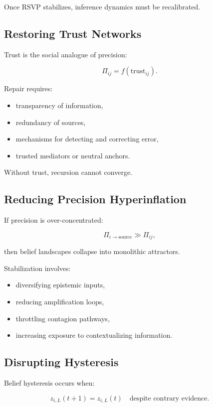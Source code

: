 \documentclass[12pt,oneside]{book}
\theoremstyle{plain}
\theoremstyle{definition}
\begin{document}
Once RSVP stabilizes, inference dynamics must be recalibrated.

\subsection{Restoring Trust Networks}

Trust is the social analogue of precision:

\[
\Pi_{ij} = f(\text{trust}_{ij}).
\]

Repair requires:

\begin{itemize}
    \item transparency of information,
    \item redundancy of sources,
    \item mechanisms for detecting and correcting error,
    \item trusted mediators or neutral anchors.
\end{itemize}

Without trust, recursion cannot converge.

\subsection{Reducing Precision Hyperinflation}

If precision is over-concentrated:

\[
\Pi_{i\rightarrow \text{source}} \gg \Pi_{ij},
\]

then belief landscapes collapse into monolithic attractors.

Stabilization involves:

\begin{itemize}
    \item diversifying epistemic inputs,
    \item reducing amplification loops,
    \item throttling contagion pathways,
    \item increasing exposure to contextualizing information.
\end{itemize}

\subsection{Disrupting Hysteresis}

Belief hysteresis occurs when:

\[
z_{i,L}(t+1) = z_{i,L}(t)
\quad\text{despite contrary evidence}.
\]
\end{document}
